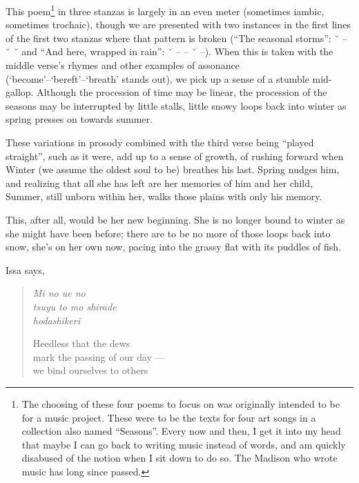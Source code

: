 \documentclass[12pt]{memoir}
\begin{document}
This poem\footnote{The choosing of these four poems to focus on was originally intended to be for a music project. These were to be the texts for four art songs in a collection also named ``Seasons''. Every now and then, I get it into my head that maybe I can go back to writing music instead of words, and am quickly disabused of the notion when I sit down to do so. The Madison who wrote music has long since passed.} in three stanzas is largely in an even meter (sometimes iambic, sometimes trochaic), though we are presented with two instances in the first lines of the first two stanzas where that pattern is broken (``The seasonal storms'': ˘ -- ˘ ˘ and ``And here, wrapped in rain'': ˘ -- -- ˘ --). When this is taken with the middle verse's rhymes and other examples of assonance (`become'--`bereft'--`breath' stands out), we pick up a sense of a stumble mid-gallop. Although the procession of time may be linear, the procession of the seasons may be interrupted by little stalls, little snowy loops back into winter as spring presses on towards summer.

These variations in prosody combined with the third verse being ``played straight'', such as it were, add up to a sense of growth, of rushing forward when Winter (we assume the oldest soul to be) breathes his last. Spring nudges him, and realizing that all she has left are her memories of him and her child, Summer, still unborn within her, walks those plains with only his memory.

This, after all, would be her new beginning. She is no longer bound to winter as she might have been before; there are to be no more of those loops back into snow, she's on her own now, pacing into the grassy flat with its puddles of fish.

Issa says,

\begin{verse}
\begin{multicols}{2}
\emph{Mi no ue no} \\
\emph{tsuyu to mo shirade} \\
\emph{hodashikeri}

\columnbreak

Heedless that the dews \\
mark the passing of our day --- \\
we bind ourselves to others
\end{multicols}
\vspace{-1em}
\parencite[11]{issa}
\end{verse}
\end{document}
